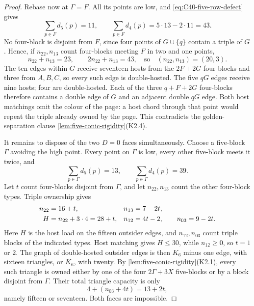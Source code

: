 \begin{proof}
Rebase now at $\Gamma=F$.  All its points are low, and
\eqref{eq:C40-five-row-defect} gives
\[
 \sum_{p\in F}d_5(p)=11,\qquad
 \sum_{p\in F}d_4(p)=5\cdot13-2\cdot11=43.
\]
No four-block is disjoint from $F$, since four points of $G\cup\{q\}$
contain a triple of $G$.  Hence, if $n_{22},n_{13}$ count four-blocks
meeting $F$ in two and one points,
\[
 n_{22}+n_{13}=23,\qquad2n_{22}+n_{13}=43,
 \quad\text{so}\quad(n_{22},n_{13})=(20,3).
\]
The ten edges within $G$ receive seventeen hosts from the
$2F+2G$ four-blocks and three from $A,B,C$, so every such edge is
double-hosted.  The five $qG$ edges receive nine hosts; four are
 double-hosted.  Each of the three $q+F+2G$ four-blocks therefore contains
 a double edge of $G$ and an adjacent double $qG$ edge.  Both host matchings
 omit the colour of the page: a host chord through that point would repeat
 the triple already owned by the page.  This contradicts the
 golden-separation clause \cref{lem:five-conic-rigidity}(K2.4).

It remains to dispose of the two $D=0$ faces simultaneously.  Choose a
five-block $\Gamma$ avoiding the high point.  Every point on $\Gamma$ is
low, every other five-block meets it twice, and
\[
 \sum_{p\in\Gamma}d_5(p)=13,\qquad
 \sum_{p\in\Gamma}d_4(p)=39.
\]
Let $t$ count four-blocks disjoint from $\Gamma$, and let $n_{22},n_{13}$
count the other four-block types.  Triple ownership gives
\begin{align}
 n_{22}&=16+t,&n_{13}&=7-2t,\notag\\
 H&=n_{22}+3\cdot4=28+t,&
 n_{12}&=4t-2,\qquad n_{03}=9-2t.\label{eq:C40-five-routing}
\end{align}
Here $H$ is the host load on the fifteen outsider edges, and $n_{12},n_{03}$
count triple blocks of the indicated types.  Host matching gives $H\le30$,
while $n_{12}\ge0$, so $t=1$ or $2$.  The graph of double-hosted outsider
edges is then $K_6$ minus one edge, with sixteen triangles, or $K_6$, with
twenty.  By \cref{lem:five-conic-rigidity}(K2.1), every such triangle is
owned either by one of the four $2\Gamma+3X$ five-blocks or by a block
disjoint from $\Gamma$.  Their total triangle capacity is only
\[
 4+(n_{03}+4t)=13+2t,
\]
namely fifteen or seventeen.  Both faces are impossible.


\end{proof}
